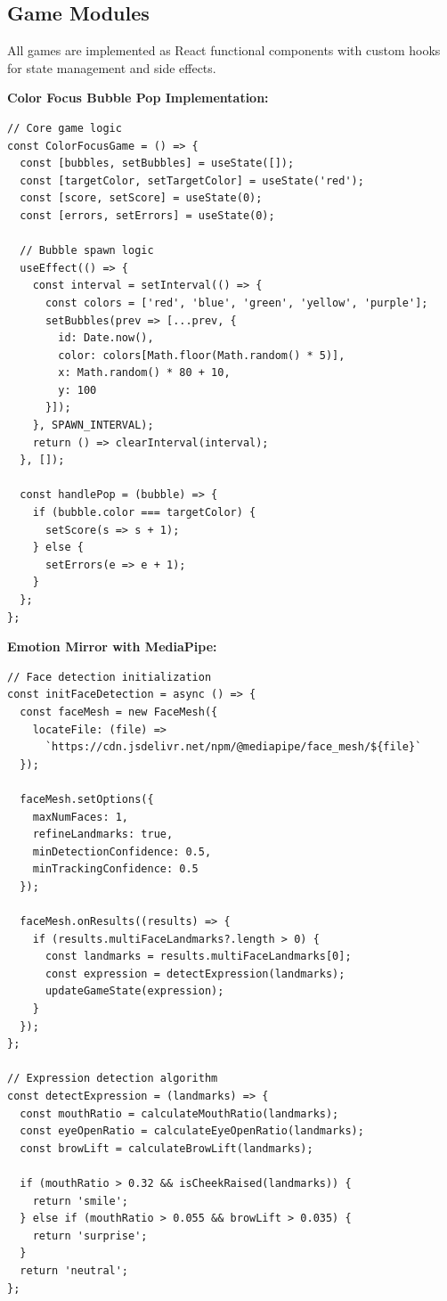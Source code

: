 \documentclass[12pt,letterpaper]{article}
\begin{document}
\subsection{Game Modules}

All games are implemented as React functional components with custom hooks for state management and side effects.

\textbf{Color Focus Bubble Pop Implementation:}

\begin{verbatim}
// Core game logic
const ColorFocusGame = () => {
  const [bubbles, setBubbles] = useState([]);
  const [targetColor, setTargetColor] = useState('red');
  const [score, setScore] = useState(0);
  const [errors, setErrors] = useState(0);
  
  // Bubble spawn logic
  useEffect(() => {
    const interval = setInterval(() => {
      const colors = ['red', 'blue', 'green', 'yellow', 'purple'];
      setBubbles(prev => [...prev, {
        id: Date.now(),
        color: colors[Math.floor(Math.random() * 5)],
        x: Math.random() * 80 + 10,
        y: 100
      }]);
    }, SPAWN_INTERVAL);
    return () => clearInterval(interval);
  }, []);
  
  const handlePop = (bubble) => {
    if (bubble.color === targetColor) {
      setScore(s => s + 1);
    } else {
      setErrors(e => e + 1);
    }
  };
};
\end{verbatim}

\textbf{Emotion Mirror with MediaPipe:}

\begin{verbatim}
// Face detection initialization
const initFaceDetection = async () => {
  const faceMesh = new FaceMesh({
    locateFile: (file) => 
      `https://cdn.jsdelivr.net/npm/@mediapipe/face_mesh/${file}`
  });
  
  faceMesh.setOptions({
    maxNumFaces: 1,
    refineLandmarks: true,
    minDetectionConfidence: 0.5,
    minTrackingConfidence: 0.5
  });
  
  faceMesh.onResults((results) => {
    if (results.multiFaceLandmarks?.length > 0) {
      const landmarks = results.multiFaceLandmarks[0];
      const expression = detectExpression(landmarks);
      updateGameState(expression);
    }
  });
};

// Expression detection algorithm
const detectExpression = (landmarks) => {
  const mouthRatio = calculateMouthRatio(landmarks);
  const eyeOpenRatio = calculateEyeOpenRatio(landmarks);
  const browLift = calculateBrowLift(landmarks);
  
  if (mouthRatio > 0.32 && isCheekRaised(landmarks)) {
    return 'smile';
  } else if (mouthRatio > 0.055 && browLift > 0.035) {
    return 'surprise';
  }
  return 'neutral';
};
\end{verbatim}
\end{document}
